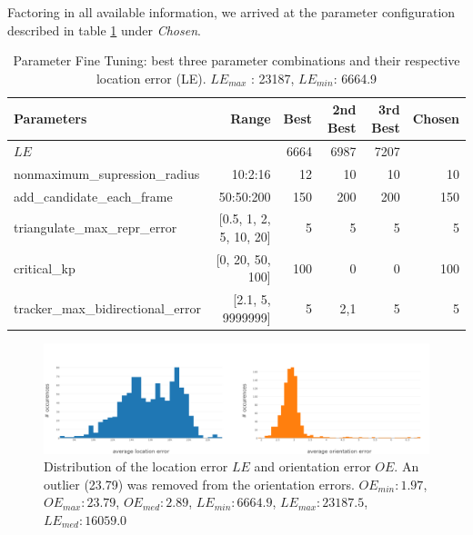 \medskip

Factoring in all available information, we arrived at the parameter configuration described in table \ref{table:significant-param-tuning} under \emph{Chosen}.

\begin{table}[htp]
	\centering
	\caption{Parameter Fine Tuning: best three parameter combinations and their respective location error (LE). $LE_{max}$ : 23187, $LE_{min}$: 6664.9}
	\label{table:significant-param-tuning}
	\begin{tabular}{lrrrrr}
		\hline
		\textbf{Parameters}                &         \textbf{Range} & \textbf{Best} & \textbf{2nd Best} & \textbf{3rd Best} & \textbf{Chosen} \\ \hline
		$LE$                &                        &          6664 &              6987 &              7207 &  \\ \hline\hline
		nonmaximum\_supression\_radius     &                10:2:16 &            12 &                10 &                10 & 10\\ \hline
		add\_candidate\_each\_frame        &              50:50:200 &           150 &               200 &               200 & 150\\ \hline
		triangulate\_max\_repr\_error      & [0.5, 1, 2, 5, 10, 20] &             5 &                 5 &                 5 & 5\\ \hline
		critical\_kp                       &       [0, 20, 50, 100] &           100 &                 0 &                 0 & 100\\ \hline
		tracker\_max\_bidirectional\_error &      [2.1, 5, 9999999] &             5 &               2,1 &                 5 & 5\\ \hline
	\end{tabular}
\end{table}

\begin{figure}[htp]
	\centering
	\includegraphics[width=1\textwidth]{figures/error_histogram}
	\caption{Distribution of the location error $LE$ and orientation error $OE$. 
	An outlier (23.79) was removed from the orientation errors. 
		$OE_{min}: 1.97$, 
		$OE_{max}: 23.79$,
		$OE_{med}: 2.89$,
		$LE_{min}: 6664.9$,
		$LE_{max}: 23187.5$,
		$LE_{med}: 16059.0$}
	\label{fig:error_histogram}
\end{figure}


